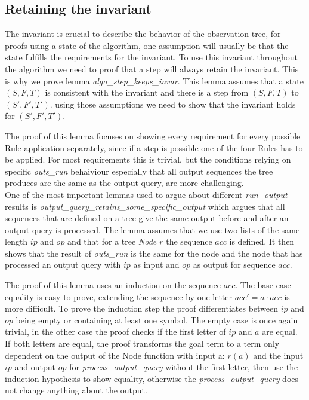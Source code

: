 \subsection{Retaining the invariant}
The invariant is crucial to describe the behavior of the observation tree, for proofs using a state of the algorithm, one assumption will usually be that the state fulfills the requirements for the invariant. To use this invariant throughout the algorithm we need to proof that a step will always retain the invariant. This is why we prove lemma \textit{algo\_step\_keeps\_invar}. This lemma assumes that a state $(S,F,T)$ is consistent with the invariant and there is a step from $(S,F,T)$ to $(S',F',T')$. using those assumptions we need to show that the invariant holds for $(S',F',T')$. 
\begin{myisabelle}
	\retaininvar
\end{myisabelle}
The proof of this lemma focuses on showing every requirement for every possible Rule application separately, since if a step is possible one of the four Rules has to be applied. For most requirements this is trivial, but the conditions relying on specific \textit{outs\_run} behaiviour especially that all output sequences the tree produces are the same as the output query, are more challenging.\\ 
One of the most important lemmas used to argue about different \textit{run\_output} results is \textit{output\_query\_retains\_some\_specific\_output} which argues that all sequences that are defined on a tree give the same output before and after an output query is processed. The lemma assumes that we use two lists of the same length $ip$ and $op$ and that for a tree \textit{Node $r$} the sequence $acc$ is defined. It then shows that the result of \textit{outs\_run} is the same for the node and the node that has processed an output query with $ip$ as input and $op$ as output for sequence $acc$.
\begin{myisabelle}
	\opqueryretains
\end{myisabelle} 
The proof of this lemma uses an induction on the sequence $acc$. The base case equality is easy to prove, extending the sequence by one letter $acc'=a \cdot acc$ is more difficult. To prove the induction step the proof differentiates between $ip$ and $op$ being empty or containing at least one symbol. The empty case is once again trivial, in the other case the proof checks if the first letter of $ip$ and $a$ are equal. If both letters are equal, the proof transforms the goal term to a term only dependent on the output of the Node function with input a: $r(a)$ and the input $ip$ and output $op$ for \textit{process\_output\_query} without the first letter, then use the induction hypothesis to show equality, otherwise the \textit{process\_output\_query} does not change anything about the output. \\

